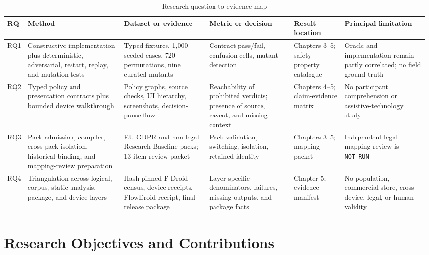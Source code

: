 \begin{table}[H]
\centering
\caption{Research-question to evidence map}
\label{tab:rq-evidence-map}
\scriptsize
\setlength{\tabcolsep}{3pt}
\begin{tabular}{>{\raggedright\arraybackslash}p{}>{\raggedright\arraybackslash}p{}>{\raggedright\arraybackslash}p{}>{\raggedright\arraybackslash}p{}>{\raggedright\arraybackslash}p{}>{\raggedright\arraybackslash}p{}}
\toprule
RQ & Method & Dataset or evidence & Metric or decision & Result location & Principal limitation \\
\midrule
RQ1 & Constructive implementation plus deterministic, adversarial, restart, replay, and mutation tests & Typed fixtures, 1,000 seeded cases, 720 permutations, nine curated mutants & Contract pass/fail, confusion cells, mutant detection & Chapters 3--5; safety-property catalogue & Oracle and implementation remain partly correlated; no field ground truth \\
RQ2 & Typed policy and presentation contracts plus bounded device walkthrough & Policy graphs, source checks, UI hierarchy, screenshots, decision-pause flow & Reachability of prohibited verdicts; presence of source, caveat, and missing context & Chapters 4--5; claim-evidence matrix & No participant comprehension or assistive-technology study \\
RQ3 & Pack admission, compiler, cross-pack isolation, historical binding, and mapping-review preparation & EU GDPR and non-legal Research Baseline packs; 13-item review packet & Pack validation, switching, isolation, retained identity & Chapters 3--5; mapping packet & Independent legal mapping review is \texttt{NOT\_RUN} \\
RQ4 & Triangulation across logical, corpus, static-analysis, package, and device layers & Hash-pinned F-Droid census, device receipts, FlowDroid receipt, final release package & Layer-specific denominators, failures, missing outputs, and package facts & Chapter 5; evidence manifest & No population, commercial-store, cross-device, legal, or human validity \\
\bottomrule
\end{tabular}
\end{table}

\section{Research Objectives and Contributions}

